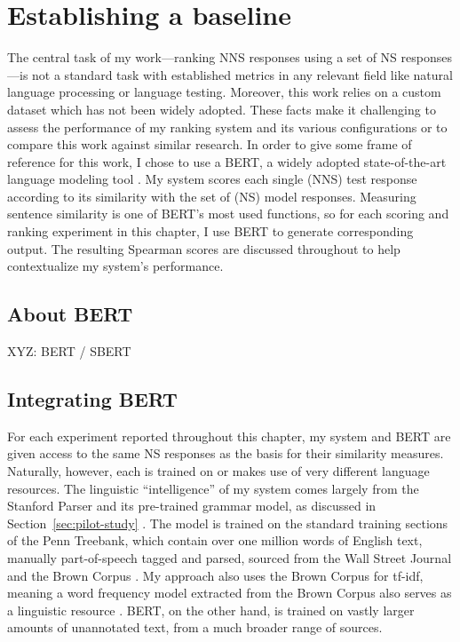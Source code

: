 \section{Establishing a baseline}
\label{sec:bert-baseline}
The central task of my work---ranking NNS responses using a set of NS responses---is not a standard task with established metrics in any relevant field like natural language processing or language testing. Moreover, this work relies on a custom dataset which has not been widely adopted. These facts make it challenging to assess the performance of my ranking system and its various configurations or to compare this work against similar research. In order to give some frame of reference for this work, I chose to use a BERT, a widely adopted state-of-the-art language modeling tool \cite{BertDevlin2018}. My system scores each single (NNS) test response according to its similarity with the set of (NS) model responses. Measuring sentence similarity is one of BERT's most used functions, so for each scoring and ranking experiment in this chapter, I use BERT to generate corresponding output. The resulting Spearman scores are discussed throughout to help contextualize my system's performance.
\subsection{About BERT}
\label{sec:about-bert}
XYZ: BERT / SBERT

\subsection{Integrating BERT}

For each experiment reported throughout this chapter, my system and BERT are given access to the same NS responses as the basis for their similarity measures. Naturally, however, each is trained on or makes use of very different language resources. The linguistic ``intelligence'' of my system comes largely from the Stanford Parser and its pre-trained grammar model, as discussed in Section~\ref{sec:pilot-study} \cite{klein:manning:03}. The model is trained on the standard training sections of the Penn Treebank, which contain over one million words of English text, manually part-of-speech tagged and parsed, sourced from the Wall Street Journal and the Brown Corpus \cite{marcus-et-al:93}. My approach also uses the Brown Corpus for tf-idf, meaning a word frequency model extracted from the Brown Corpus also serves as a linguistic resource \cite{kucera:francis:67}. BERT, on the other hand, is trained on vastly larger amounts of unannotated text, from a much broader range of sources.

